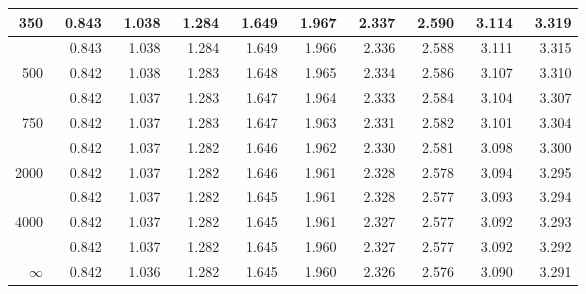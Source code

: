 \begin{center}
\begin{tabular}{r | rrr rr rrrr}
350	&	~0.843	&	~1.038	&	~1.284	&	~1.649	&	~1.967	&	~2.337	&	~2.590	&	~3.114	&	~3.319	\\
\hline
\gray	400	&	~0.843	&	~1.038	&	~1.284	&	~1.649	&	~1.966	&	~2.336	&	~2.588	&	~3.111	&	~3.315	\\
   500	&	~0.842	&	~1.038	&	~1.283	&	~1.648	&	~1.965	&	~2.334	&	~2.586	&	~3.107	&	~3.310	\\
\gray	600	&	~0.842	&	~1.037	&	~1.283	&	~1.647	&	~1.964	&	~2.333	&	~2.584	&	~3.104	&	~3.307	\\
	750	&	~0.842	&	~1.037	&	~1.283	&	~1.647	&	~1.963	&	~2.331	&	~2.582	&	~3.101	&	~3.304	\\
\gray   1000	&	~0.842	&	~1.037	&	~1.282	&	~1.646	&	~1.962	&	~2.330	&	~2.581	&	~3.098	&	~3.300	\\
\hline
\hline
	2000	&	~0.842	&	~1.037	&	~1.282	&	~1.646	&	~1.961	&	~2.328	&	~2.578	&	~3.094	&	~3.295	\\
\gray        3000	&	~0.842	&	~1.037	&	~1.282	&	~1.645	&	~1.961	&	~2.328	&	~2.577	&	~3.093	&	~3.294	\\
 4000	&	~0.842	&	~1.037	&	~1.282	&	~1.645	&	~1.961	&	~2.327	&	~2.577	&	~3.092	&	~3.293	\\
\gray        5000	&	~0.842	&	~1.037	&	~1.282	&	~1.645	&	~1.960	&	~2.327	&	~2.577	&	~3.092	&	~3.292	\\
   $\infty$ &  ~0.842  &   ~1.036  &   ~1.282  &   ~1.645  &   ~1.960  &   ~2.326  &   ~2.576  &   ~3.090  &   ~3.291  \\
    \hline

\end{tabular}
\end{center}

